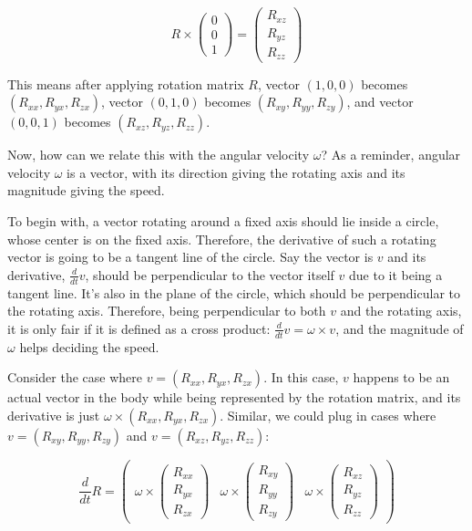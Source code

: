 \documentclass[12pt,a4paper,twoside,openright]{report}
\begin{document}
    
\begin{equation}
    R \times\begin{pmatrix}
        0 \\
        0 \\
        1
        \end{pmatrix}
        =
        \begin{pmatrix}
        R_{xz} \\
        R_{yz} \\
        R_{zz}
        \end{pmatrix}
    \end{equation}

This means after applying rotation matrix $R$, vector $(1, 0, 0)$ becomes $(R_{xx}, R_{yx}, R_{zx})$, vector $(0, 1, 0)$ becomes $(R_{xy}, R_{yy}, R_{zy})$, and vector $(0, 0, 1)$ becomes $(R_{xz}, R_{yz}, R_{zz})$.

Now, how can we relate this with the angular velocity $\omega$? As a reminder, angular velocity $\omega$ is a vector, with its direction giving the rotating axis and its magnitude giving the speed. 

To begin with, a vector rotating around a fixed axis should lie inside a circle, whose center is on the fixed axis. Therefore, the derivative of such a rotating vector is going to be a tangent line of the circle. Say the vector is $v$ and its derivative, $\frac{d}{dt}v$, should be perpendicular to the vector itself $v$ due to it being a tangent line. It's also in the plane of the circle, which should be perpendicular to the rotating axis. Therefore, being perpendicular to both $v$ and the rotating axis, it is only fair if it is defined as a cross product: $\frac{d}{dt}v = \omega\times v$, and the magnitude of $\omega$ helps deciding the speed.

Consider the case where $v=(R_{xx}, R_{yx}, R_{zx})$. In this case, $v$ happens to be an actual vector in the body while being represented by the rotation matrix, and its derivative is just $\omega\times (R_{xx}, R_{yx}, R_{zx})$. Similar, we could plug in cases where $v=(R_{xy}, R_{yy}, R_{zy})$ and $v=(R_{xz}, R_{yz}, R_{zz})$:

\begin{equation}
\frac{d}{dt}R = \begin{pmatrix}
    \omega\times\begin{pmatrix}
        R_{xx} \\
        R_{yx} \\
        R_{zx}
        \end{pmatrix} &
        \omega\times\begin{pmatrix}
            R_{xy} \\
            R_{yy} \\
            R_{zy}
            \end{pmatrix} &
            \omega\times\begin{pmatrix}
                R_{xz} \\
                R_{yz} \\
                R_{zz}
                \end{pmatrix}
    \end{pmatrix}
\end{equation}
\end{document}
